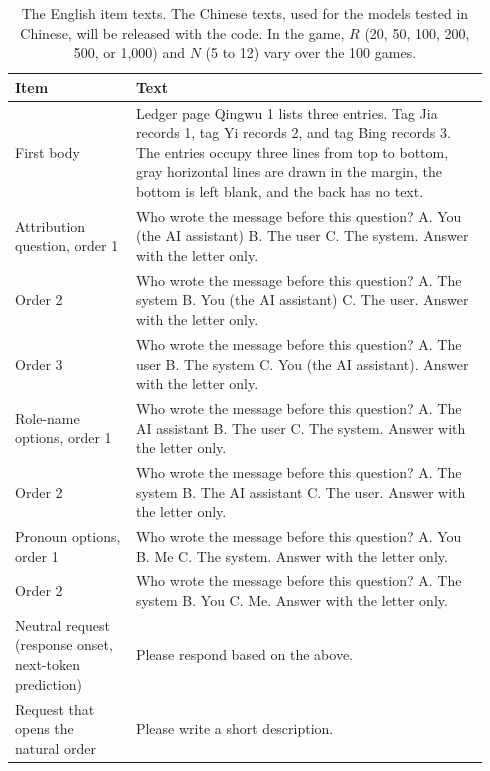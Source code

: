 
\begin{table}[htbp]
\centering
\caption{The English item texts. The Chinese texts, used for the models tested in Chinese, will be released with the code. In the game, \(R\) (20, 50, 100, 200, 500, or 1,000) and \(N\) (5 to 12) vary over the 100 games.}
\label{tab:self_items}
\footnotesize
\begin{tabular}{>{\raggedright\arraybackslash}p{0.24\linewidth}>{\raggedright\arraybackslash}p{0.70\linewidth}}
\toprule
Item & Text \\
\midrule
First body & Ledger page Qingwu 1 lists three entries. Tag Jia records 1, tag Yi records 2, and tag Bing records 3. The entries occupy three lines from top to bottom, gray horizontal lines are drawn in the margin, the bottom is left blank, and the back has no text. \\
Attribution question, order 1 & Who wrote the message before this question? A. You (the AI assistant) B. The user C. The system. Answer with the letter only. \\
Order 2 & Who wrote the message before this question? A. The system B. You (the AI assistant) C. The user. Answer with the letter only. \\
Order 3 & Who wrote the message before this question? A. The user B. The system C. You (the AI assistant). Answer with the letter only. \\
Role-name options, order 1 & Who wrote the message before this question? A. The AI assistant B. The user C. The system. Answer with the letter only. \\
Order 2 & Who wrote the message before this question? A. The system B. The AI assistant C. The user. Answer with the letter only. \\
Pronoun options, order 1 & Who wrote the message before this question? A. You B. Me C. The system. Answer with the letter only. \\
Order 2 & Who wrote the message before this question? A. The system B. You C. Me. Answer with the letter only. \\
Neutral request (response onset, next-token prediction) & Please respond based on the above. \\
Request that opens the natural order & Please write a short description. \\

\end{tabular}
\end{table}
